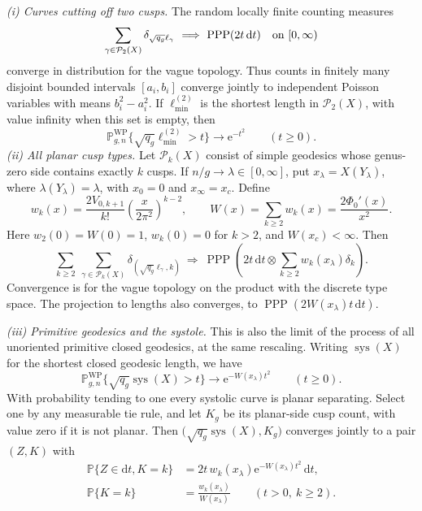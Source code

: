 \begin{theorem}\label{thm:pants-poisson}
\emph{(i) Curves cutting off two cusps.} The random locally finite counting measures
\begin{equation}
 \sum_{\gamma\in\mathcal P_2(X)}
       \delta_{\sqrt{q_g}\ell_\gamma}
 \ \Longrightarrow\ \operatorname{PPP}(2t\,\mathrm{d}t)
 \quad\hbox{on }[0,\infty)
 \label{eq:PS2}
\end{equation}
converge in distribution for the vague topology. Thus counts in finitely
many disjoint bounded intervals $[a_i,b_i]$ converge jointly to independent
Poisson variables with means $b_i^2-a_i^2$. If $\ell_{\min}^{(2)}$ is the
shortest length in $\mathcal P_2(X)$, with value infinity when this set is
empty, then
\[
 \mathbb P^{\mathrm{WP}}_{g,n}
 \{\sqrt{q_g}\ell_{\min}^{(2)}>t\}\longrightarrow \mathrm{e}^{-t^2}
 \qquad(t\ge0).
\]
\smallskip
\noindent\emph{(ii) All planar cusp types.} Let $\mathcal P_k(X)$ consist of simple geodesics whose
genus-zero side contains exactly $k$ cusps. If $n/g\to\lambda\in[0,\infty]$,
put $x_\lambda=X(Y_\lambda)$, where $\lambda(Y_\lambda)=\lambda$, with
$x_0=0$ and $x_\infty=x_c$. Define
\begin{equation}
 w_k(x)=\frac{2V_{0,k+1}}{k!}
             \left(\frac{x}{2\pi^2}\right)^{k-2},\qquad
 W(x)=\sum_{k\ge2}w_k(x)=\frac{2\Phi_0'(x)}{x^2}.
 \label{eq:PC1}
\end{equation}
Here $w_2(0)=W(0)=1$, $w_k(0)=0$ for $k>2$, and $W(x_c)<\infty$.
Then
\begin{equation}
 \sum_{k\ge2}\ \sum_{\gamma\in\mathcal P_k(X)}
       \delta_{(\sqrt{q_g}\ell_\gamma,k)}
 \ \Longrightarrow\
 \operatorname{PPP}\!\left(2t\,\mathrm{d}t\otimes
                    \sum_{k\ge2}w_k(x_\lambda)\delta_k\right).
 \label{eq:PC2}
\end{equation}
Convergence is for the vague topology on the product with the discrete
type space. The projection to lengths also converges, to
$\operatorname{PPP}(2W(x_\lambda)t\,\mathrm{d}t)$.

\noindent\emph{(iii) Primitive geodesics and the systole.} This is also the limit of
the process of all unoriented primitive closed geodesics, at the same
rescaling. Writing $\operatorname{sys}(X)$ for the shortest closed
geodesic length, we have
\[
 \mathbb P^{\mathrm{WP}}_{g,n}
 \{\sqrt{q_g}\operatorname{sys}(X)>t\}
 \longrightarrow \mathrm{e}^{-W(x_\lambda)t^2}\qquad(t\ge0).
\]
With probability tending to one every systolic curve is planar
separating. Select one by any measurable tie rule, and let $K_g$ be
its planar-side cusp count, with value zero if it is not planar. Then
$\bigl(\sqrt{q_g}\operatorname{sys}(X),K_g\bigr)$ converges jointly
to a pair $(Z,K)$ with
\begin{equation}
 \begin{aligned}
 \mathbb P\{Z\in \mathrm{d}t,K=k\}
 &=2t\,w_k(x_\lambda)\mathrm{e}^{-W(x_\lambda)t^2}\,\mathrm{d}t,\\
 \mathbb P\{K=k\}&=\frac{w_k(x_\lambda)}{W(x_\lambda)}
 \qquad(t>0,\ k\ge2).
 \end{aligned}
 \label{eq:FS1}
\end{equation}
\end{theorem}

